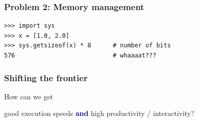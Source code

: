 \documentclass[
    xcolor={svgnames,dvipsnames},
    hyperref={colorlinks, citecolor=DeepPink4, linkcolor=DarkRed, urlcolor=DarkBlue}
    ]{beamer}  %
\newcommand{\navy}[1]{\textcolor{DarkBlue}{\bf #1}}
\newcommand{\1}{\mathbbm 1}
\begin{document}
\begin{frame}[fragile]
    \frametitle{Problem 2: Memory management}

    \begin{verbatim}
>>> import sys
>>> x = [1.0, 2.0]
>>> sys.getsizeof(x) * 8      # number of bits
576                           # whaaaat???
    \end{verbatim}


\end{frame}



\begin{frame}
    
    \begin{figure}
       \centering
    \end{figure}

\end{frame}


\begin{frame}
    \frametitle{Shifting the frontier}
    
    How can we get 

    \begin{center}
    good execution speeds \navy{and} high productivity / interactivity?
    \end{center}

\end{frame}
\end{document}

